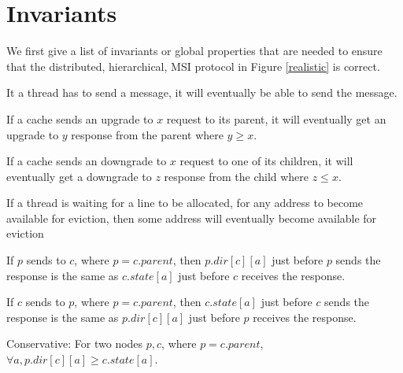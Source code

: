 \section{Invariants}
\label{sec:properties}

We first give a list of invariants or global properties that are needed to
ensure that the distributed, hierarchical, MSI protocol in Figure
\ref{realistic} is correct.

\begin{theorem}
It a thread has to send a message, it will eventually be able to send the
message.
\label{canSend}
\end{theorem}

\begin{theorem}
If a cache sends an upgrade to $x$ request to its parent, it will eventually
get an upgrade to $y$ response from the parent where $y \ge x$.
\label{willRecv}
\end{theorem}

\begin{theorem}
If a cache sends an downgrade to $x$ request to one of its children, it will
eventually get a downgrade to $z$ response from the child where $z \le x$.
\label{willRecv2}
\end{theorem}

\begin{theorem}
If a thread is waiting for a line to be allocated, \ie for any address to become
available for eviction, then some address will eventually become available for
eviction
\label{evictDead}
\end{theorem}

\begin{theorem}
If $p$ sends  to $c$, where $p = c.parent$, then $p.dir[c][a]$
just before $p$ sends the response is the same as $c.state[a]$ just before $c$
receives the response.
\label{pcSame}
\end{theorem}

\begin{theorem}
If $c$ sends  to $p$, where $p = c.parent$, then $c.state[a]$
just before $c$ sends the response is the same as $p.dir[c][a]$ just before $p$
receives the response.
\label{cpSame}
\end{theorem}

\begin{theorem}
Conservative: For two nodes $p, c$, where $p = c.parent$, $\forall a,
p.dir[c][a] \ge c.state[a]$.
\label{conservative}
\end{theorem}

